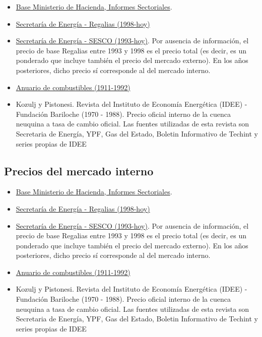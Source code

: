 \documentclass[letterpaper,11pt, spanish]{scrartcl}
\begin{document}
\begin{itemize}
    \item \hyperlink{https://www.argentina.gob.ar/economia/politicaeconomica/regionalysectorial/informesproductivos}{Base Ministerio de Hacienda, Informes
Sectoriales}.
    \item \hyperlink{http://datos.minem.gob.ar/dataset/regalias-de-petroleo-crudo-gas-natural-glp-gasolina-y-condensado}{Secretaría de Energía - Regalias (1998-hoy)}
    \item \hyperlink{http://datos.minem.gob.ar/dataset/produccion-de-petroleo-y-gas-tablas-dinamicas}{Secretaría de Energía - SESCO (1993-hoy)}. Por ausencia de información, el precio de base Regalias entre 1993 y 1998 es el precio total (es decir, es un ponderado que incluye también el precio del mercado externo). En los años posteriores, dicho precio sí corresponde al del mercado interno. 
    \item \hyperlink{http://datos.minem.gob.ar/dataset/anuarios-de-combustibles-1950-1999}{Anuario de combustibles (1911-1992)}
    \item Kozulj y Pistonesi. Revista  del Instituto de Economía Energética (IDEE) - Fundación Bariloche  (1970 - 1988). Precio oficial interno de la cuenca neuquina a tasa de cambio oficial. Las fuentes utilizadas de esta revista son Secretaria de Energía, YPF, Gas del Estado, Boletin Informativo de Techint y series propias de IDEE
\end{itemize}

\subsection{Precios del mercado interno}

\begin{itemize}
    \item \hyperlink{https://www.argentina.gob.ar/economia/politicaeconomica/regionalysectorial/informesproductivos}{Base Ministerio de Hacienda, Informes
Sectoriales}.
    \item \hyperlink{http://datos.minem.gob.ar/dataset/regalias-de-petroleo-crudo-gas-natural-glp-gasolina-y-condensado}{Secretaría de Energía - Regalias (1998-hoy)}
    \item \hyperlink{http://datos.minem.gob.ar/dataset/produccion-de-petroleo-y-gas-tablas-dinamicas}{Secretaría de Energía - SESCO (1993-hoy)}. Por ausencia de información, el precio de base Regalias entre 1993 y 1998 es el precio total (es decir, es un ponderado que incluye también el precio del mercado externo). En los años posteriores, dicho precio sí corresponde al del mercado interno. 
    \item \hyperlink{http://datos.minem.gob.ar/dataset/anuarios-de-combustibles-1950-1999}{Anuario de combustibles (1911-1992)}
    \item Kozulj y Pistonesi. Revista  del Instituto de Economía Energética (IDEE) - Fundación Bariloche  (1970 - 1988). Precio oficial interno de la cuenca neuquina a tasa de cambio oficial. Las fuentes utilizadas de esta revista son Secretaria de Energía, YPF, Gas del Estado, Boletin Informativo de Techint y series propias de IDEE
\end{itemize}
\end{document}
